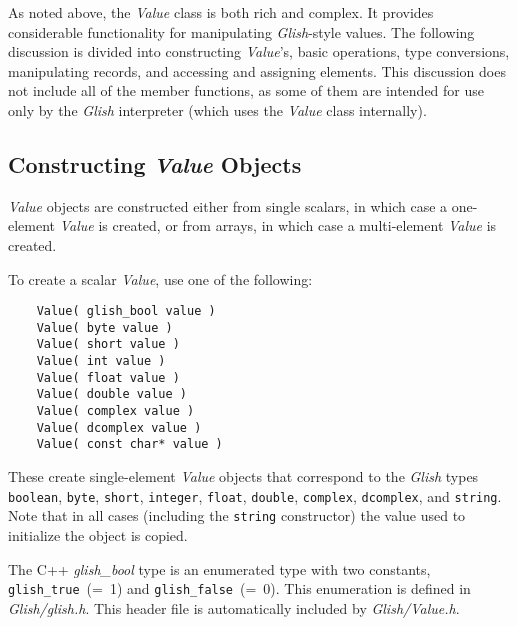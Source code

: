 As noted above, the {\em Value} class is both rich and complex.  It
provides considerable functionality for manipulating {\em Glish}-style values.
The following discussion is divided into constructing 
{\em Value\/}'s, basic
operations, type conversions, manipulating records, and accessing and
assigning elements.
This discussion does not include all of the member 
functions, as some of them are
intended for use only by the {\em Glish} interpreter (which uses the {\em Value}
class internally).

\subsection{Constructing {\em Value} Objects}
\label{value-constructors}

{\em Value} objects are constructed either from single scalars,
in which case a one-element {\em Value} is created, or from arrays,
in which case a multi-element {\em Value} is created.

To create a scalar {\em Value\/}, use one of the following:
\begin{verbatim}
    Value( glish_bool value )
    Value( byte value )
    Value( short value )
    Value( int value )
    Value( float value )
    Value( double value )
    Value( complex value )
    Value( dcomplex value )
    Value( const char* value )
\end{verbatim}
These create single-element {\em Value\/} objects
that correspond to the {\em Glish} types
{\tt boolean}, {\tt byte}, {\tt short}, {\tt integer}, {\tt float},
{\tt double}, {\tt complex}, {\tt dcomplex}, and {\tt string}.
Note that in all cases (including the {\tt string} constructor) the value
used to initialize the object is copied.

The C++ {\em glish\_bool}
type is an enumerated type with two constants, {\tt glish\_true}~(=~1) and
{\tt glish\_false\/}~(=~0). This enumeration is defined in {\em Glish/glish.h}.
This header file is automatically included by {\em Glish/Value.h}.

